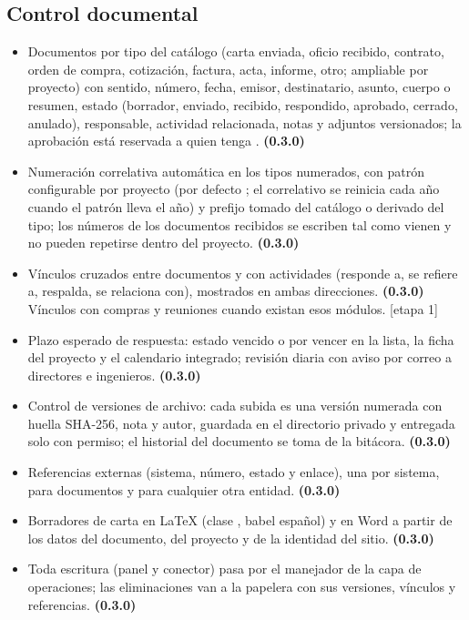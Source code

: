 \documentclass[11pt,a4paper]{article}
\newcommand{\etapa}[1]{\textcolor{grismedio}{[etapa #1]}}
\begin{document}
\subsection{Control documental}
\label{sec:documentos}
\begin{itemize}
\item Documentos por tipo del catálogo (carta enviada, oficio recibido, contrato, orden de compra, cotización, factura, acta, informe, otro; ampliable por proyecto) con sentido, número, fecha, emisor, destinatario, asunto, cuerpo o resumen, estado (borrador, enviado, recibido, respondido, aprobado, cerrado, anulado), responsable, actividad relacionada, notas y adjuntos versionados; la aprobación está reservada a quien tenga . \textbf{(0.3.0)}
\item Numeración correlativa automática en los tipos numerados, con patrón configurable por proyecto (por defecto ; el correlativo se reinicia cada año cuando el patrón lleva el año) y prefijo tomado del catálogo o derivado del tipo; los números de los documentos recibidos se escriben tal como vienen y no pueden repetirse dentro del proyecto. \textbf{(0.3.0)}
\item Vínculos cruzados entre documentos y con actividades (responde a, se refiere a, respalda, se relaciona con), mostrados en ambas direcciones. \textbf{(0.3.0)} Vínculos con compras y reuniones cuando existan esos módulos. \etapa{1}
\item Plazo esperado de respuesta: estado vencido o por vencer en la lista, la ficha del proyecto y el calendario integrado; revisión diaria con aviso por correo a directores e ingenieros. \textbf{(0.3.0)}
\item Control de versiones de archivo: cada subida es una versión numerada con huella SHA-256, nota y autor, guardada en el directorio privado y entregada solo con permiso; el historial del documento se toma de la bitácora. \textbf{(0.3.0)}
\item Referencias externas (sistema, número, estado y enlace), una por sistema, para documentos y para cualquier otra entidad. \textbf{(0.3.0)}
\item Borradores de carta en LaTeX (clase , babel español) y en Word a partir de los datos del documento, del proyecto y de la identidad del sitio. \textbf{(0.3.0)}
\item Toda escritura (panel y conector) pasa por el manejador  de la capa de operaciones; las eliminaciones van a la papelera con sus versiones, vínculos y referencias. \textbf{(0.3.0)}
\end{itemize}
\end{document}
